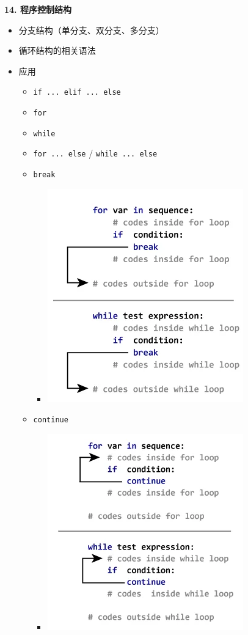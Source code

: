 \documentclass[11pt]{article}
\providecommand{\tightlist}{%
      \setlength{\itemsep}{0pt}\setlength{\parskip}{0pt}}
\begin{document}
    \textbf{14. 程序控制结构}

\begin{itemize}
\tightlist
\item
  分支结构（单分支、双分支、多分支）
\item
  循环结构的相关语法
\item
  应用

  \begin{itemize}
  \tightlist
  \item
    \texttt{if\ ...\ elif\ ...\ else}
  \item
    \texttt{for}
  \item
    \texttt{while}
  \item
    \texttt{for\ ...\ else} / \texttt{while\ ...\ else}
  \item
    \texttt{break}

    \begin{itemize}
    \tightlist
    \item
      \includegraphics{./images/break.png}
    \end{itemize}
  \item
    \texttt{continue}

    \begin{itemize}
    \tightlist
    \item
      \includegraphics{./images/continue.png}
    \end{itemize}
  \end{itemize}
\end{itemize}
\end{document}
